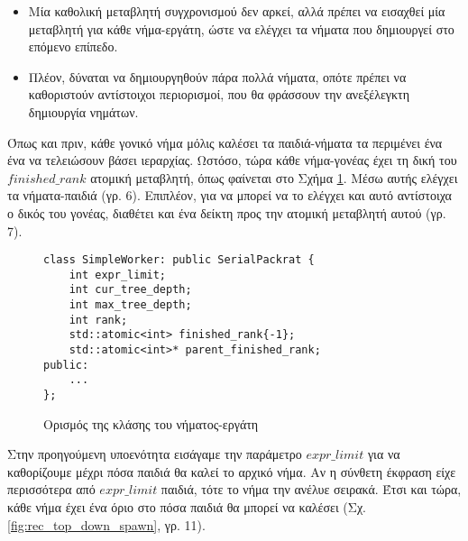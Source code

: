 \begin{itemize}
	\item Μία καθολική μεταβλητή συγχρονισμού δεν αρκεί, αλλά πρέπει να εισαχθεί μία μεταβλητή για κάθε νήμα-εργάτη, ώστε να ελέγχει τα νήματα που δημιουργεί στο επόμενο επίπεδο.
	\item Πλέον, δύναται να δημιουργηθούν πάρα πολλά νήματα, οπότε πρέπει να καθοριστούν αντίστοιχοι περιορισμοί, που θα φράσσουν την ανεξέλεγκτη δημιουργία νημάτων.
\end{itemize}

Όπως και πριν, κάθε γονικό νήμα μόλις καλέσει τα παιδιά-νήματα τα περιμένει ένα ένα να τελειώσουν βάσει ιεραρχίας.
Ωστόσο, τώρα κάθε νήμα-γονέας έχει τη δική του $finished\_rank$ ατομική μεταβλητή, όπως φαίνεται στο Σχήμα \ref{fig:rec_top_down_worker}.
Μέσω αυτής ελέγχει τα νήματα-παιδιά (γρ. 6).
Επιπλέον, για να μπορεί να το ελέγχει και αυτό αντίστοιχα ο δικός του γονέας, διαθέτει και ένα δείκτη προς την ατομική μεταβλητή αυτού (γρ. 7).

\begin{figure}[h]
\setlength\partopsep{-\topsep}%
\begin{verbatim}
class SimpleWorker: public SerialPackrat {
    int expr_limit;
    int cur_tree_depth;
    int max_tree_depth;
    int rank;
    std::atomic<int> finished_rank{-1};
    std::atomic<int>* parent_finished_rank;
public:
    ...
};

\end{verbatim}
\caption{Ορισμός της κλάσης του νήματος-εργάτη}
\label{fig:rec_top_down_worker}
\end{figure}

Στην προηγούμενη υποενότητα εισάγαμε την παράμετρο $expr\_limit$ για να καθορίζουμε μέχρι πόσα παιδιά θα καλεί το αρχικό νήμα.
Αν η σύνθετη έκφραση είχε περισσότερα από $expr\_limit$ παιδιά, τότε το νήμα την ανέλυε σειρακά.
Έτσι και τώρα, κάθε νήμα έχει ένα όριο στο πόσα παιδιά θα μπορεί να καλέσει (Σχ. \ref{fig:rec_top_down_spawn}, γρ. 11).

